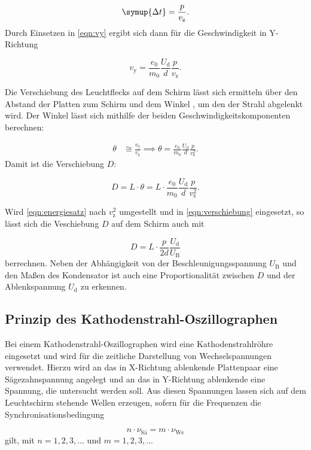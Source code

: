 \begin{equation}
\symup{\Delta{t}} = \frac{p}{v_{\text{z}}}.
\end{equation}
Durch Einsetzen in \ref{eqn:vy} ergibt sich dann für die Geschwindigkeit in Y-Richtung 

\begin{equation}
v_{\text{y}} = \frac{e_0}{m_0} \frac{U_{\text{d}}}{d} \frac{p}{v_{\text{z}}}.
\end{equation}

Die Verschiebung des Leuchtflecks auf dem Schirm lässt sich ermitteln über den Abstand der Platten zum Schirm und dem Winkel \theta, um den der Strahl abgelenkt wird.
Der Winkel lässt sich mithilfe der beiden Geschwindigkeitskomponenten berechnen:

\begin{equation}
\begin{aligned}
\theta &\cong \frac{v_{\text{y}}}{v_{\text{z}}}
\implies \theta = \frac{e_0}{m_0} \frac{U_{\text{d}}}{d} \frac{p}{v_{\text{z}}^2}.
\end{aligned}
\end{equation}
Damit ist die Verschiebung $D$:

\begin{equation}
D = L \cdot \theta = L \cdot \frac{e_0}{m_0} \frac{U_{\text{d}}}{d} \frac{p}{v_{\text{z}}^2}.
\label{eqn:verschiebung}
\end{equation}

Wird \ref{eqn:energiesatz} nach $v_{\text{z}}^2$ umgestellt und in \ref{eqn:verschiebung} eingesetzt, so lässt sich die Veschiebung $D$ auf dem Schirm auch mit

\begin{equation}
D = L \cdot \frac{p}{2d} \frac{U_{\text{d}}}{U_{\text{B}}}
\end{equation}
berrechnen. Neben der Abhängigkeit von der Beschleunigungsspannung $U_{\text{B}}$ und den Maßen des Kondensator ist auch eine Proportionalität zwischen $D$ und der Ablenkspannung $U_{\text{d}}$ zu erkennen. 




\subsection{Prinzip des Kathodenstrahl-Oszillographen}
Bei einem Kathodenstrahl-Oszillographen wird eine Kathodenstrahlröhre eingesetzt und wird für die zeitliche Darstellung von Wechselspannungen verwendet. Hierzu wird an das in X-Richtung ablenkende Plattenpaar 
eine Sägezahnspannung angelegt und an das in Y-Richtung ablenkende eine Spannung, die untersucht werden soll. Aus diesen Spannungen lassen sich auf dem Leuchtschirm stehende Wellen erzeugen, sofern für die 
Frequenzen die Synchronisationsbedingung

\begin{equation}
n\cdot \nu_{\text{Sä}} = m \cdot \nu_{\text{We}}
\end{equation}
gilt, mit $n = 1,2,3,...$ und $m = 1,2,3,...$